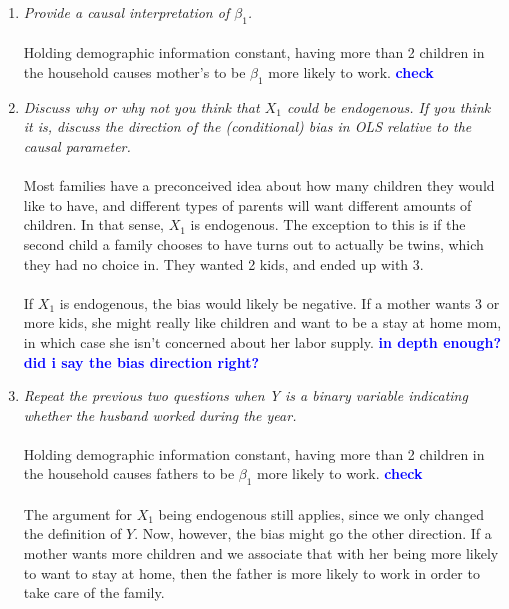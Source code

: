 \documentclass[12pt,oneside,reqno]{amsart}
\newcommand{\fix} [1] {\textbf{\textcolor{blue}{#1}}} %
\begin{document}
\begin{enumerate}[label = (\roman*)]

\item \textit{Provide a causal interpretation of $\beta_1$.}\\
\\
Holding demographic information constant, having more than 2 children in the household causes mother's to be $\beta_1$ more likely to work.  \fix{check}
\\

\item \textit{Discuss why or why not you think that $X_1$ could be endogenous. If you think it is, discuss the direction of the (conditional) bias in OLS relative to the causal parameter.}\\
\\
Most families have a preconceived idea about how many children they would like to have, and different types of parents will want different amounts of children. In that sense, $X_1$ is endogenous. The exception to this is if the second child a family chooses to have turns out to actually be twins, which they had no choice in. They wanted 2 kids, and ended up with 3. \\
\\
If $X_1$ is endogenous, the bias would likely be negative. If a mother wants 3 or more kids, she might really like children and want to be a stay at home mom, in which case she isn't concerned about her labor supply. \fix{in depth enough? did i say the bias direction right?} 
\\

\item \textit{Repeat the previous two questions when Y is a binary variable indicating whether the husband worked during the year.}\\
\\
Holding demographic information constant, having more than 2 children in the household causes fathers to be $\beta_1$ more likely to work.  \fix{check} 
\\\\
The argument for $X_1$ being endogenous still applies, since we only changed the definition of $Y$. Now, however, the bias might go the other direction. If a mother wants more children and we associate that with her being more likely to want to stay at home, then the father is more likely to work in order to take care of the family. 
\\



\end{enumerate}
\end{document}
